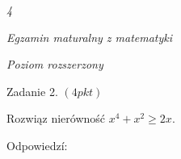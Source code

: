 \documentclass[a4paper,12pt]{article}
\begin{document}
{\it 4}

{\it Egzamin maturalny z matematyki}

{\it Poziom rozszerzony}

Zadanie 2. $(4pkt)$

Rozwiąz nierówność $x^{4}+x^{2}\geq 2x.$

Odpowiedzí:
\end{document}
